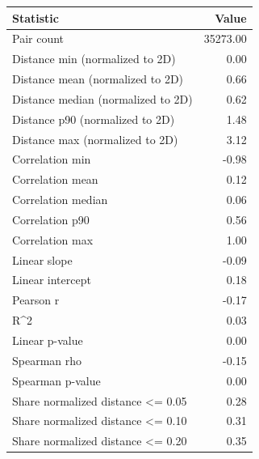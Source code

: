 \begin{tabular}{lr}
\toprule
Statistic & Value \\
\midrule
Pair count & 35273.00 \\
Distance min (normalized to 2D) & 0.00 \\
Distance mean (normalized to 2D) & 0.66 \\
Distance median (normalized to 2D) & 0.62 \\
Distance p90 (normalized to 2D) & 1.48 \\
Distance max (normalized to 2D) & 3.12 \\
Correlation min & -0.98 \\
Correlation mean & 0.12 \\
Correlation median & 0.06 \\
Correlation p90 & 0.56 \\
Correlation max & 1.00 \\
Linear slope & -0.09 \\
Linear intercept & 0.18 \\
Pearson r & -0.17 \\
R^2 & 0.03 \\
Linear p-value & 0.00 \\
Spearman rho & -0.15 \\
Spearman p-value & 0.00 \\
Share normalized distance <= 0.05 & 0.28 \\
Share normalized distance <= 0.10 & 0.31 \\
Share normalized distance <= 0.20 & 0.35 \\
\bottomrule
\end{tabular}

